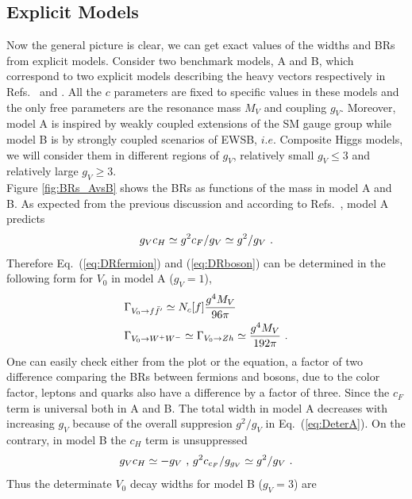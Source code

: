 \subsection{Explicit Models}
Now the general picture is clear, we can get exact values of the widths and BRs from explicit models. Consider two benchmark models, A and B, which correspond to two explicit models describing the heavy vectors respectively in Refs.~\cite{modelA} and \cite{compositehiggs-1}. All the $c$ parameters are fixed to specific values in these models and the only free parameters are the resonance mass $M_{V}$ and coupling $g_{V}$. Moreover, model A is inspired by weakly coupled extensions of the SM gauge group while model B is by strongly coupled scenarios of EWSB, $i.e.$ Composite Higgs models, we will consider them in different regions of $g_{V}$, relatively small $g_{V}\leq3$ and relatively large $g_{V}\geq3$.\\
\newline Figure \ref{fig:BRs_AvsB} shows the BRs as functions of the mass in model A and B. As expected from the previous discussion and according to Refs.~\cite{modelA}, model A predicts
\begin{align}
  \label{eq:DeterA}
  g_{V}c_{H}\simeq g^{2}c_{F}/g_{V}\simeq g^{2}/g_{V}\textup{ .}
\end{align}
Therefore Eq.~(\ref{eq:DRfermion}) and (\ref{eq:DRboson}) can be determined in the following form for $V_{0}$ in model A ($g_{V}=1$),
\begin{align}
  &\Gamma_{V_{0}\rightarrow f\bar{f}'}\simeq N_{c}[f]\frac{g^{4}M_{V}}{96\pi}\nonumber\\
  &\Gamma_{V_{0}\rightarrow W^{+}W^{-}}\simeq \Gamma_{V_{0}\rightarrow Zh}\simeq \frac{g^{4}M_{V}}{192\pi}\textup{ .}
\end{align}
One can easily check either from the plot or the equation, a factor of two difference comparing the BRs between fermions and bosons, due to the color factor, leptons and quarks also have a difference by a factor of three. Since the $c_{F}$ term is universal both in A and B. The total width in model A decreases with increasing $g_{V}$ because of the overall suppresion $g^{2}/g_{V}$ in Eq.~(\ref{eq:DeterA}). On the contrary, in model B the $c_{H}$ term is unsuppressed
\begin{align}
  \label{eq:DeterB}
  g_{V}c_{H}\simeq-g_{V}\textup{ , }g^{2}c_{c_{F}}/g_{g_{V}}\simeq g^{2}/g_{V}\textup{ .}
\end{align}
Thus the determinate $V_{0}$ decay widths for model B ($g_{V}=3$) are
